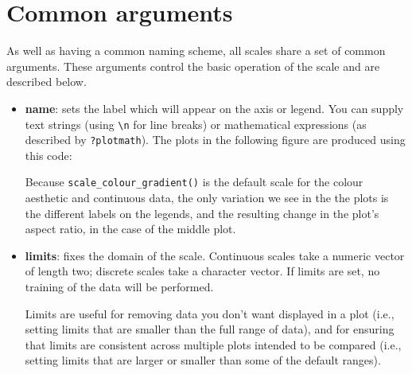 \section{Common arguments}
\label{sec:scale-arguments}

As well as having a common naming scheme, all scales share a set of common arguments.  These arguments control the basic operation of the scale and are described below.

\begin{itemize}
  \item {\bf name}:  sets the label which will appear on the axis or legend. You can supply text strings (using \verb|\n| for line breaks) or mathematical expressions (as described by \verb|?plotmath|).  The plots in the following figure are produced using this code:

    

  Because {\tt scale\_colour\_gradient()} is the default scale for the colour aesthetic and continuous data, the only variation we see in the the plots is the different labels on the legends, and the resulting change in the plot's aspect ratio, in the case of the middle plot.

    

  \item {\bf limits}: fixes the domain of the scale.   Continuous scales take a numeric vector of length two; discrete scales take a character vector. If limits are set, no training of the data will be performed.  
  
  Limits are useful for removing data you don't want displayed in a plot (i.e., setting limits that are smaller than the full range of data), and for ensuring that limits are consistent across multiple plots intended to be compared (i.e., setting limits that are larger or smaller than some of the default ranges).  
  

\end{itemize}
